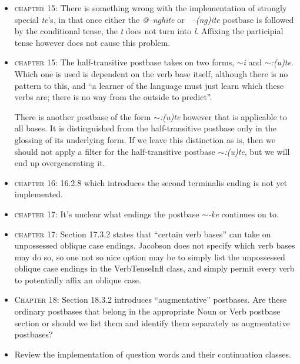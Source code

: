 \documentclass{article}
\begin{document}
\begin{itemize}
\item \textsc{chapter 15}: There is something wrong with the implementation of strongly special \textit{te}'s, in that once either the \textit{@--nghite} or \textit{~--(ng)ite} postbase is followed by the conditional tense, the \textit{t} does not turn into \textit{l}.
%
Affixing the participial tense however does not cause this problem.

\item \textsc{chapter 15}: The half-transitive postbase takes on two forms, \textit{$\sim$i} and \textit{$\sim$:(u)te}.
%
Which one is used is dependent on the verb base itself, although there is no pattern to this, and ``a learner of the language must just learn which these verbs are; there is no way from the outside to predict''.

There is another postbase of the form \textit{$\sim$:(u)te} however that is applicable to all bases.
%
It is distinguished from the half-transitive postbase only in the glossing of its underlying form.
%
If we leave this distinction as is, then we should not apply a filter for the half-transitive postbase \textit{$\sim$:(u)te}, but we will end up overgenerating it.

\item \textsc{chapter 16}: 16.2.8 which introduces the second terminalis ending is not yet implemented.

\item \textsc{chapter 17}: It's unclear what endings the postbase \textit{$\sim$-ke} continues on to.

\item \textsc{chapter 17}: Section 17.3.2 states that ``certain verb bases'' can take on unpossessed oblique case endings.
%
Jacobson does not specify which verb bases may do so, so one not so nice option may be to simply list the unpossessed oblique case endings in the VerbTenseInfl class, and simply permit every verb to potentially affix an oblique case.

\item \textsc{Chapter 18}: Section 18.3.2 introduces ``augmentative'' postbases.
%
Are these ordinary postbases that belong in the appropriate Noun or Verb postbase section or should we list them and identify them separately as augmentative postbases?

\item Review the implementation of question words and their continuation classes.

\end{itemize}
\end{document}
